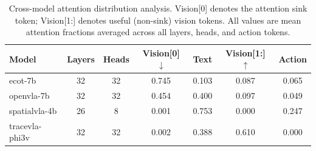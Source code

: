 \begin{table}[htbp]
  \centering
  \caption{Cross-model attention distribution analysis. Vision[0] denotes the attention sink token; Vision[1:] denotes useful (non-sink) vision tokens. All values are mean attention fractions averaged across all layers, heads, and action tokens.}
  \label{tab:cross_model_sink}
  \begin{tabular}{lcccccc}
    \toprule
    Model & Layers & Heads & Vision[0] $\downarrow$ & Text & Vision[1:] $\uparrow$ & Action \\
    \midrule
    ecot-7b & 32 & 32 & 0.745 & 0.103 & 0.087 & 0.065 \\
    openvla-7b & 32 & 32 & 0.454 & 0.400 & 0.097 & 0.049 \\
    spatialvla-4b & 26 & 8 & 0.001 & 0.753 & 0.000 & 0.247 \\
    tracevla-phi3v & 32 & 32 & 0.002 & 0.388 & 0.610 & 0.000 \\
    \bottomrule
  \end{tabular}
\end{table}